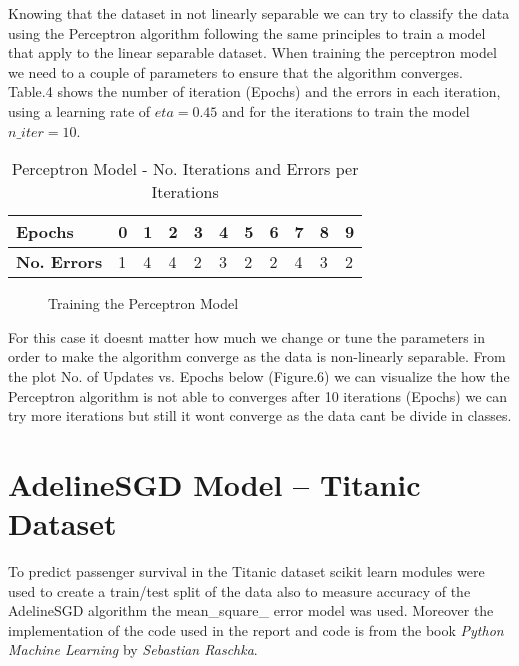 \documentclass[12pt]{article} %
\begin{document}
Knowing that the dataset in not linearly separable we can try to classify the data using the Perceptron algorithm following the same principles to train a model that apply to the linear separable dataset.  When training the perceptron model we need to a couple of parameters to ensure that the algorithm converges. Table.4 shows the number of iteration (Epochs) and the errors in each iteration, using a learning rate of $eta=0.45$ and for the iterations to train the model $n\_iter = 10$. 

\begin{table}[ht]
\centering
\caption{Perceptron Model - No. Iterations and Errors per Iterations}
\begin{tabular}{@{}lllllllllll@{}}
\toprule
\textbf{Epochs}     & 0 & 1 & 2 & 3 & 4 & 5 & 6 & 7 & 8 & 9 \\ \midrule
\textbf{No. Errors} & 1 & 4 & 4 & 2 & 3 & 2 & 2 & 4 & 3 & 2 \\ \bottomrule
\end{tabular}
\end{table}


\begin{figure}[ht]
\caption{Training the Perceptron Model}\label{fig:Perceptron01}
\centering
\end{figure}

For this case it doesnt matter how much we change or tune the parameters in order to make the algorithm converge as the data is non-linearly separable. From the plot No. of Updates vs. Epochs below (Figure.6) we can visualize the how the Perceptron algorithm is not able to converges after 10 iterations (Epochs) we can try more iterations but still it wont converge as the data cant be divide in classes.



\section{AdelineSGD Model -- Titanic Dataset}

To predict passenger survival in the Titanic dataset scikit learn modules were used to create a train/test split of the data also to measure accuracy of the AdelineSGD algorithm the mean\_square\_ error model was used. Moreover the implementation of the code used in the report and code is from the book \textit{Python Machine Learning} by \textit{Sebastian Raschka}.
\end{document}
